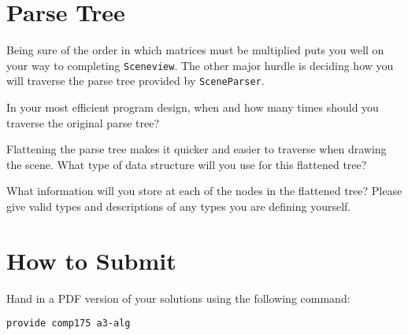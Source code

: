 \documentclass[10pt,twocolumn]{article}
\begin{document}
\vspace{20em}

\begin{framed}
\vspace{15em}
\end{framed}


\section{Parse Tree}
Being sure of the order in which matrices must be multiplied puts you well on your way to completing {\tt Sceneview}. The other major hurdle is deciding how you will traverse the parse tree provided by {\tt SceneParser}.
\begin{framed}
\noindent {\bf [1 point]} In your most efficient program design, when and how many times should you traverse the original parse tree?
\vspace{10em}
\end{framed}
\begin{framed}
\noindent {\bf [1 point]} Flattening the parse tree makes it quicker and easier to traverse when drawing the scene. What type of data structure will you use for this flattened tree?
\vspace{10em}
\end{framed}
\begin{framed}
\noindent {\bf [1 point]} What information will you store at each of the nodes in the flattened tree? Please give valid types and descriptions of any types you are defining yourself.
\vspace{10em}
\end{framed}

\section{How to Submit}

Hand in a PDF version of your solutions using the following command:
\begin{center}
 {\tt provide comp175 a3-alg}
 \end{center}
\end{document}
